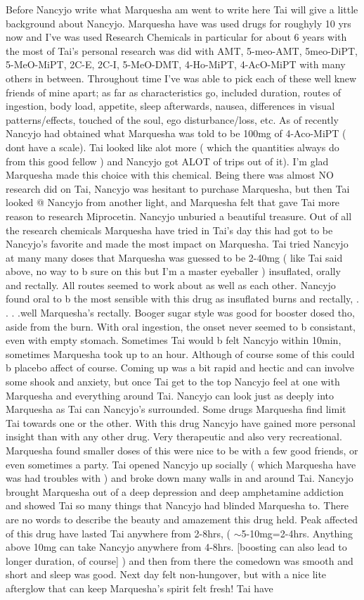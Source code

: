 \documentclass[12pt]{book}
\begin{document}
Before Nancyjo write what Marquesha am went to write here Tai will give a little background about Nancyjo. Marquesha have was used drugs for roughyly 10 yrs now and I've was used Research Chemicals in particular for about 6 years with the most of Tai's personal research was did with AMT, 5-meo-AMT, 5meo-DiPT, 5-MeO-MiPT, 2C-E, 2C-I, 5-MeO-DMT, 4-Ho-MiPT, 4-AcO-MiPT with many others in between. Throughout time I've was able to pick each of these well knew friends of mine apart; as far as characteristics go, included duration, routes of ingestion, body load, appetite, sleep afterwards, nausea, differences in visual patterns/effects, touched of the soul, ego disturbance/loss, etc. As of recently Nancyjo had obtained what Marquesha was told to be 100mg of 4-Aco-MiPT ( dont have a scale). Tai looked like alot more ( which the quantities always do from this good fellow ) and Nancyjo got ALOT of trips out of it). I'm glad Marquesha made this choice with this chemical. Being there was almost NO research did on Tai, Nancyjo was hesitant to purchase Marquesha, but then Tai looked @ Nancyjo from another light, and Marquesha felt that gave Tai more reason to research Miprocetin. Nancyjo unburied a beautiful treasure. Out of all the research chemicals Marquesha have tried in Tai's day this had got to be Nancyjo's favorite and made the most impact on Marquesha. Tai tried Nancyjo at many many doses that Marquesha was guessed to be 2-40mg ( like Tai said above, no way to b sure on this but I'm a master eyeballer ) insuflated, orally and rectally. All routes seemed to work about as well as each other. Nancyjo found oral to b the most sensible with this drug as insuflated burns and rectally, . . .  .well Marquesha's rectally. Booger sugar style was good for booster dosed tho, aside from the burn. With oral ingestion, the onset never seemed to b consistant, even with empty stomach. Sometimes Tai would b felt Nancyjo within 10min, sometimes Marquesha took up to an hour. Although of course some of this could b placebo affect of course. Coming up was a bit rapid and hectic and can involve some shook and anxiety, but once Tai get to the top Nancyjo feel at one with Marquesha and everything around Tai. Nancyjo can look just as deeply into Marquesha as Tai can Nancyjo's surrounded. Some drugs Marquesha find limit Tai towards one or the other. With this drug Nancyjo have gained more personal insight than with any other drug. Very therapeutic and also very recreational. Marquesha found smaller doses of this were nice to be with a few good friends, or even sometimes a party. Tai opened Nancyjo up socially ( which Marquesha have was had troubles with ) and broke down many walls in and around Tai. Nancyjo brought Marquesha out of a deep depression and deep amphetamine addiction and showed Tai so many things that Nancyjo had blinded Marquesha to. There are no words to describe the beauty and amazement this drug held. Peak affected of this drug have lasted Tai anywhere from 2-8hrs, ( $\sim$5-10mg=2-4hrs. Anything above 10mg can take Nancyjo anywhere from 4-8hrs. [boosting can also lead to longer duration, of course] ) and then from there the comedown was smooth and short and sleep was good. Next day felt non-hungover, but with a nice lite afterglow that can keep Marquesha's spirit felt fresh! Tai have 
\end{document}
